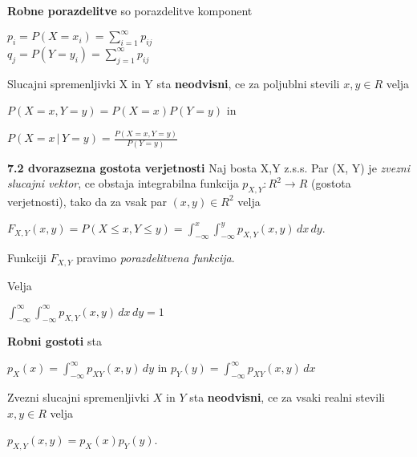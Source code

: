 \documentclass{article}
\begin{document}
\begin{multicols}{2}
\textbf{Robne porazdelitve} so porazdelitve komponent\\
\begin{center}
    \begin{math}
        p_i = P(X = x_i) = \sum_{i = 1}^{\infty} p_{ij}
    \end{math}\\
    \begin{math}
        q_j = P(Y = y_i) = \sum_{j = 1}^{\infty} p_{ij}
    \end{math}
\end{center}
Slucajni spremenljivki X in Y sta \textbf{neodvisni},
ce za poljublni stevili $x,y \in R$ velja
\begin{center}
    \begin{math}
        P(X = x, Y = y) = P(X = x)P(Y = y)
    \end{math} in
\end{center}
\begin{center}
    \begin{math}
        P(X = x\, |\, Y = y) = \frac{P(X = x, Y = y)}{P(Y = y)}
    \end{math}
\end{center}

\textbf{7.2 dvorazsezna gostota verjetnosti}
Naj bosta X,Y z.s.s. Par (X, Y) je \textit{zvezni slucajni vektor},
ce obstaja integrabilna funkcija $p_{X,Y}: R^2 \rightarrow R$ (gostota verjetnosti), tako da za
vsak par $(x,y) \in R^2$ velja
\begin{center}
    \begin{math}
        F_{X,Y}(x, y) = P(X \leq x, Y \leq y) = \int_{-\infty}^{x}\int_{-\infty}^{y} p_{X,Y}(x,y)\,dx\,dy
    \end{math}.
\end{center}
\begin{small}
Funkciji $F_{X,Y}$ pravimo \textit{porazdelitvena funkcija}.    
\end{small}
Velja
\begin{center}
    \begin{math}
        \int_{-\infty}^{\infty}\int_{-\infty}^{\infty} p_{X,Y}(x,y)\,dx\,dy = 1
    \end{math}
\end{center}
\textbf{Robni gostoti} sta
\begin{center}
    \begin{math}
        p_X(x) = \int_{-\infty}^{\infty} p_{XY}(x,y)\, dy
    \end{math} in
    \begin{math}
        p_Y(y) = \int_{-\infty}^{\infty} p_{XY}(x,y)\, dx
    \end{math}
\end{center}
Zvezni slucajni spremenljivki $X$ in $Y$ sta \textbf{neodvisni}, ce
za vsaki realni stevili $x, y \in R$ velja
\begin{center}
    \begin{math}
        p_{X,Y}(x,y) = p_X(x)p_Y(y)
    \end{math}.
\end{center}


\end{multicols}
\end{document}
